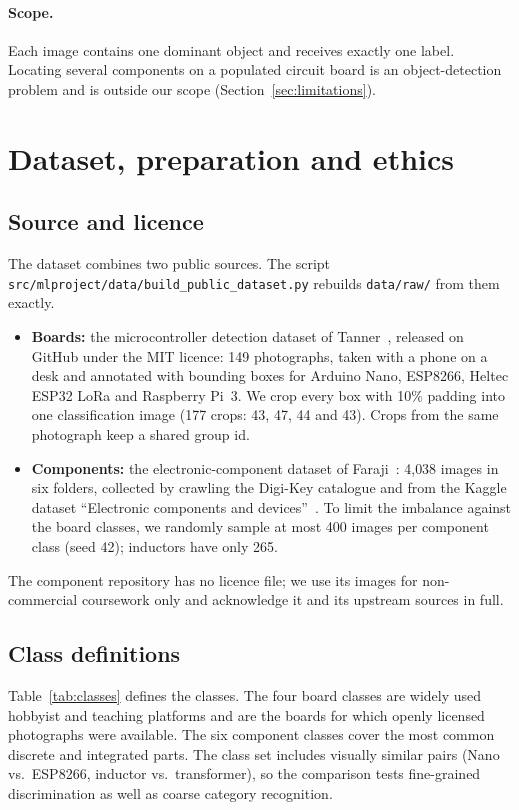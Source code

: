 \documentclass[11pt,a4paper]{article}
\providecommand{\Seed}{42}
\begin{document}
\paragraph{Scope.} Each image contains one dominant object and receives exactly one label. Locating several components on a populated circuit board is an object-detection problem and is outside our scope (Section~\ref{sec:limitations}).

\section{Dataset, preparation and ethics}\label{sec:data}
\subsection{Source and licence}
The dataset combines two public sources. The script \texttt{src/mlproject/data/build\_public\_dataset.py} rebuilds \texttt{data/raw/} from them exactly.
\begin{itemize}
  \item \textbf{Boards:} the microcontroller detection dataset of Tanner~\cite{tanner2019}, released on GitHub under the MIT licence: 149 photographs, taken with a phone on a desk and annotated with bounding boxes for Arduino Nano, ESP8266, Heltec ESP32 LoRa and Raspberry Pi~3. We crop every box with 10\% padding into one classification image (177 crops: 43, 47, 44 and 43). Crops from the same photograph keep a shared group id.
  \item \textbf{Components:} the electronic-component dataset of Faraji~\cite{faraji2023}: 4{,}038 images in six folders, collected by crawling the Digi-Key catalogue and from the Kaggle dataset ``Electronic components and devices''~\cite{aryaminus}. To limit the imbalance against the board classes, we randomly sample at most 400 images per component class (seed \Seed); inductors have only 265.
\end{itemize}
The component repository has no licence file; we use its images for non-commercial coursework only and acknowledge it and its upstream sources in full.

\subsection{Class definitions}
Table~\ref{tab:classes} defines the classes. The four board classes are widely used hobbyist and teaching platforms and are the boards for which openly licensed photographs were available. The six component classes cover the most common discrete and integrated parts. The class set includes visually similar pairs (Nano vs.\ ESP8266, inductor vs.\ transformer), so the comparison tests fine-grained discrimination as well as coarse category recognition.
\end{document}
